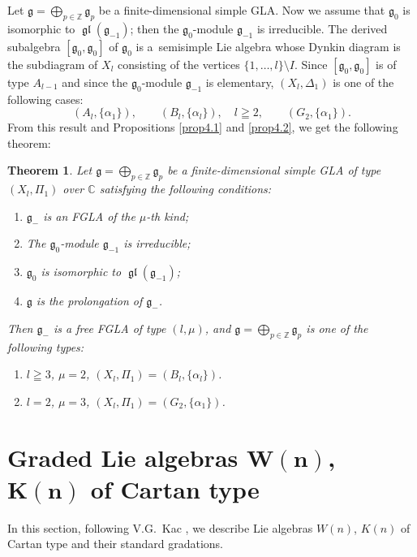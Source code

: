 \documentclass[11pt]{article}
\newtheorem{theorem}{Theorem}
\numberwithin{equation}{section}
\numberwithin{theorem}{section}
\numberwithin{proposition}{section}
\numberwithin{lemma}{section}
\numberwithin{corollary}{section}
\numberwithin{definition}{section}
\numberwithin{example}{section}
\numberwithin{remark}{section}
\numberwithin{note}{section}
\newcommand{\gl}{\operatorname{\mathfrak{gl}}}
\newcommand{\gla}[1]{\mathfrak#1=\bigoplus\limits_{p\in\mathbb Z}\mathfrak#1_p} \renewcommand{\labelenumi}{{\rm (\arabic{enumi})}}
\begin{document}
Let $\gla g$ be a f\/inite-dimensional simple GLA.
Now we assume that $\mathfrak g_0$ is isomorphic to $\gl(\mathfrak g_{-1})$;
then the $\mathfrak g_0$-module $\mathfrak g_{-1}$ is irreducible.
The derived subalgebra $[\mathfrak g_0,\mathfrak g_0]$ of $\mathfrak g_0$
is a~semisimple Lie algebra whose Dynkin diagram is the subdiagram of
$X_l$ consisting
of the vertices $\{1,\dots,l\}\setminus I$.
Since $[\mathfrak g_0,\mathfrak g_0]$ is of type $A_{l-1}$ and since
the $\mathfrak g_0$-module $\mathfrak g_{-1}$ is elementary,
$(X_l,\Delta_1)$ is one of the following cases:
\[
(A_l,\{\alpha_1\}),\qquad (B_l,\{\alpha_l\}), \quad  l\geqq2,
\qquad (G_2,\{\alpha_1\}).
\]
From this result and Propositions \ref{prop4.1} and \ref{prop4.2}, we get the following theorem:
\begin{theorem}\label{thm5.2}
Let $\gla g$ be a finite-dimensional simple GLA of type
$(X_l,\Pi_1)$ over $\mathbb C$ satisfying the following conditions:
\begin{enumerate}\itemsep=0pt
\renewcommand{\labelenumi}{$(\roman{enumi})$}
\item $\mathfrak g_-$ is an FGLA of the $\mu$-th kind;
\item The $\mathfrak g_0$-module $\mathfrak g_{-1}$ is irreducible;
\item $\mathfrak g_0$ is isomorphic to $\gl(\mathfrak g_{-1})$;
\item $\mathfrak g$ is the prolongation of $\mathfrak g_{-}$.
\end{enumerate}

Then $\mathfrak g_-$ is a free FGLA of type
$(l,\mu)$, and
$\gla g$ is one of the following types:
\begin{enumerate}\itemsep=0pt
\renewcommand{\labelenumi}{$(\alph{enumi})$}
\item $l\geqq3$, $\mu=2$, $(X_l,\Pi_1)=(B_l,\{\alpha_l\})$.
\item $l=2$, $\mu=3$, $(X_l,\Pi_1)=(G_2,\{\alpha_1\})$.
\end{enumerate}
\end{theorem}

\section[Graded Lie algebras $W(n)$, $K(n)$ of Cartan type]{Graded Lie algebras $\boldsymbol{W(n)}$, $\boldsymbol{K(n)}$ of Cartan type}\label{section6}

In this section, following V.G.~Kac \cite{kac68:1},
we describe Lie algebras $W(n)$, $K(n)$ of Cartan type and their standard gradations.
\end{document}
